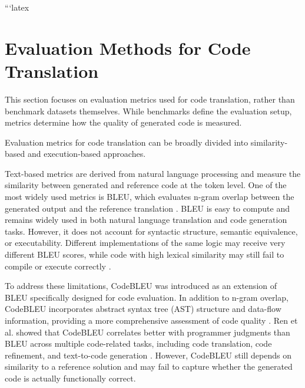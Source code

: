 ```latex %
\section{Evaluation Methods for Code Translation}

This section focuses on evaluation metrics used for code translation, rather
than benchmark datasets themselves. While benchmarks define the evaluation
setup, metrics determine how the quality of generated code is measured.

Evaluation metrics for code translation can be broadly divided into
similarity-based and execution-based approaches.

Text-based metrics are derived from natural language processing and measure the
similarity between generated and reference code at the token level. One of the
most widely used metrics is BLEU, which evaluates n-gram overlap between the
generated output and the reference translation \cite{bleu_metric}. BLEU is easy
to compute and remains widely used in both natural language translation and code
generation tasks. %
However, it does not account for syntactic structure, semantic equivalence, or
executability. Different implementations of the same logic may receive very
different BLEU scores, while code with high lexical similarity may still fail to
compile or execute correctly \cite{tran2019ruby, evtikhiev2022bleu}.

To address these limitations, CodeBLEU was introduced as an extension of BLEU
specifically designed for code evaluation. %
In addition to n-gram overlap, CodeBLEU incorporates abstract syntax tree (AST)
structure and data-flow information, providing a more comprehensive assessment
of code quality \cite{ren2020codebleu}. Ren et al. showed that CodeBLEU
correlates better with programmer judgments than BLEU across multiple
code-related tasks, including code translation, code refinement, and
text-to-code generation \cite{ren2020codebleu}. %
However, CodeBLEU still depends on similarity to a reference solution and may
fail to capture whether the generated code is actually functionally correct.

